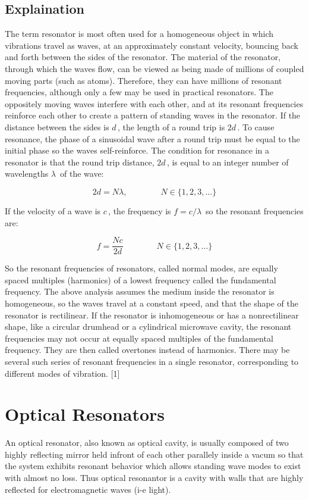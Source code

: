 \subsection{Explaination}
The term resonator is most often used for a homogeneous object in which vibrations travel as waves, at an approximately constant velocity, bouncing back and forth between the sides of the resonator. The material of the resonator, through which the waves flow, can be viewed as being made of millions of coupled moving parts (such as atoms). Therefore, they can have millions of resonant frequencies, although only a few may be used in practical resonators. The oppositely moving waves interfere with each other, and at its resonant frequencies reinforce each other to create a pattern of standing waves in the resonator. If the distance between the sides is ${\displaystyle d\,}$, the length of a round trip is ${\displaystyle 2d\,}$. To cause resonance, the phase of a sinusoidal wave after a round trip must be equal to the initial phase so the waves self-reinforce. The condition for resonance in a resonator is that the round trip distance, ${\displaystyle 2d\,}$, is equal to an integer number of wavelengths ${\displaystyle \lambda \,}$ of the wave:

$${\displaystyle 2d=N\lambda ,\qquad \qquad N\in \{1,2,3,\dots \}}$$

If the velocity of a wave is ${\displaystyle c\,}$, the frequency is ${\displaystyle f=c/\lambda \,}$ so the resonant frequencies are:

$${\displaystyle f={\frac {Nc}{2d}}\qquad \qquad N\in \{1,2,3,\dots \}}$$

So the resonant frequencies of resonators, called normal modes, are equally spaced multiples (harmonics) of a lowest frequency called the fundamental frequency. The above analysis assumes the medium inside the resonator is homogeneous, so the waves travel at a constant speed, and that the shape of the resonator is rectilinear. If the resonator is inhomogeneous or has a nonrectilinear shape, like a circular drumhead or a cylindrical microwave cavity, the resonant frequencies may not occur at equally spaced multiples of the fundamental frequency. They are then called overtones instead of harmonics. There may be several such series of resonant frequencies in a single resonator, corresponding to different modes of vibration. [1]

\section{Optical Resonators}
An optical resonator, also known as optical cavity, is usually composed of two highly reflecting mirror held infront of each other parallely inside a vacum so that the system exhibits resonant behavior which allows standing wave modes to exist with almost no loss. Thus optical resonantor is a cavity with walls that are highly reflected for electromagnetic waves (i-e light).

